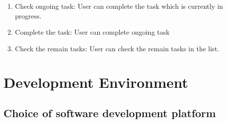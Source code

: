 \documentclass[conference]{IEEEtran}
\begin{document}
\begin{enumerate}
    \item Check ongoing task: User can complete the task which is currently in progress. \\
    \item Complete the task: User can complete ongoing task \\
    \item Check the remain tasks: User can check the remain tasks in the list. \\
\end{enumerate}

\section{Development Environment}


\subsection{Choice of software development platform}
\end{document}
